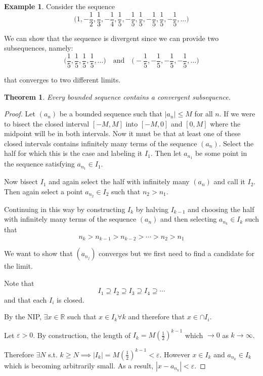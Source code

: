 \documentclass{tufte-book}
\newtheorem{theorem}{Theorem}[chapter]
\theoremstyle{definition}
\newtheorem*{example}{Example}
\numberwithin{section}{chapter}
\begin{document}
\begin{example}
Consider the sequence 
$$\big( 1, - \frac{1}{2}, \frac{1}{3}, -\frac{1}{4}, \frac{1}{5}, -\frac{1}{5}, \frac{1}{5}, -\frac{1}{5}, \frac{1}{5}, -\frac{1}{5},\ldots	\big)$$

We can show that the sequence is divergent since we can provide two subsequences, namely:
$$ \big( \frac{1}{5}, \frac{1}{5}, \frac{1}{5}, \frac{1}{5},  \ldots \big) \quad \text{and} \quad \big( -\frac{1}{5},-\frac{1}{5},-\frac{1}{5},-\frac{1}{5}, \ldots \big) $$

that converges to two different limits.
\end{example}

\begin{theorem} Every bounded sequence contains a convergent subsequence.\end{theorem}

\begin{proof}
Let $(a_n)$ be a bounded sequence such that $|a_n| \leq M$ for all $n$.  If we were to bisect the closed interval $[-M, M]$ into $[-M, 0]$ and $[0,M]$ where the midpoint will be in both intervals.  Now it must be that at least one of these closed intervals contains infinitely many terms of the sequence $(a_n)$.  Select the half for which this is the case and labeling it $I_1$.  Then let $a_{n_1}$ be some point in the sequence satisfying $a_{n_1} \in I_1$.

Now bisect $I_1$ and again select the half with infinitely many $(a_n)$ and call it $I_2$.  Then again select a point $a_{n_2} \in I_2$ such that $n_2> n_1$.

Continuing in this way by constructing $I_{k}$ by halving $I_{k-1}$ and choosing the half with infinitely many terms of the sequence $(a_n)$ and then selecting $a_{n_k} \in I_{k}$ such that
\[	n_k  > n_{k-1} > n_{k-2} > \cdots > n_{2} > n_{1}	\]


We want to show that $(a_{n_j})$ converges but we first need to find a candidate for the limit.

Note that 
\[	I_1 \supseteq I_2 \supseteq I_3 \supseteq I_4 \supseteq	\cdots \]
and that each $I_i$ is closed.

By the NIP, $\exists x \in \mathbb{R}$ such that $x \in I_k \forall k$ and therefore that $x \in \cap I_i $.


Let $\varepsilon >0$.  By construction, the length of $I_k = M (\frac{1}{2})^{k-1}$  which $\to 0$ as $k \to \infty$.

Therefore $\exists N$ s.t.  $k \geq N \implies |I_k| = M (\frac{1}{2})^{k-1} < \varepsilon$.  However $x \in I_k$ and $a_{n_k} \in I_k$ which is becoming arbitrarily small.  As a result, $|x-a_{n_k}|< \varepsilon$.

\end{proof}
\end{document}
